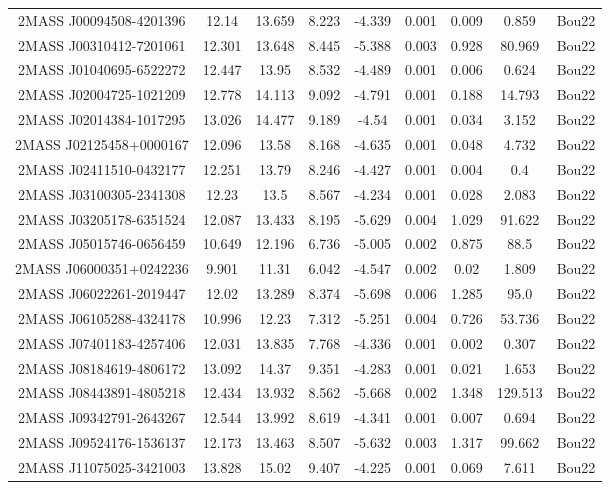 \begin{longtable}{ccccccccc}
  \hline
  \endlastfoot  %
    2MASS J00094508-4201396 & 12.14 & 13.659 & 8.223 & -4.339 & 0.001 & 0.009 & 0.859 & Bou22 \\
    2MASS J00310412-7201061 & 12.301 & 13.648 & 8.445 & -5.388 & 0.003 & 0.928 & 80.969 & Bou22 \\
    2MASS J01040695-6522272 & 12.447 & 13.95 & 8.532 & -4.489 & 0.001 & 0.006 & 0.624 & Bou22 \\
    2MASS J02004725-1021209 & 12.778 & 14.113 & 9.092 & -4.791 & 0.001 & 0.188 & 14.793 & Bou22 \\
    2MASS J02014384-1017295 & 13.026 & 14.477 & 9.189 & -4.54 & 0.001 & 0.034 & 3.152 & Bou22 \\
    2MASS J02125458+0000167 & 12.096 & 13.58 & 8.168 & -4.635 & 0.001 & 0.048 & 4.732 & Bou22 \\
    2MASS J02411510-0432177 & 12.251 & 13.79 & 8.246 & -4.427 & 0.001 & 0.004 & 0.4 & Bou22 \\
    2MASS J03100305-2341308 & 12.23 & 13.5 & 8.567 & -4.234 & 0.001 & 0.028 & 2.083 & Bou22 \\
    2MASS J03205178-6351524 & 12.087 & 13.433 & 8.195 & -5.629 & 0.004 & 1.029 & 91.622 & Bou22 \\
    2MASS J05015746-0656459 & 10.649 & 12.196 & 6.736 & -5.005 & 0.002 & 0.875 & 88.5 & Bou22 \\
    2MASS J06000351+0242236 & 9.901 & 11.31 & 6.042 & -4.547 & 0.002 & 0.02 & 1.809 & Bou22 \\
    2MASS J06022261-2019447 & 12.02 & 13.289 & 8.374 & -5.698 & 0.006 & 1.285 & 95.0 & Bou22 \\
    2MASS J06105288-4324178 & 10.996 & 12.23 & 7.312 & -5.251 & 0.004 & 0.726 & 53.736 & Bou22 \\
    2MASS J07401183-4257406 & 12.031 & 13.835 & 7.768 & -4.336 & 0.001 & 0.002 & 0.307 & Bou22 \\
    2MASS J08184619-4806172 & 13.092 & 14.37 & 9.351 & -4.283 & 0.001 & 0.021 & 1.653 & Bou22 \\
    2MASS J08443891-4805218 & 12.434 & 13.932 & 8.562 & -5.668 & 0.002 & 1.348 & 129.513 & Bou22 \\
    2MASS J09342791-2643267 & 12.544 & 13.992 & 8.619 & -4.341 & 0.001 & 0.007 & 0.694 & Bou22 \\
    2MASS J09524176-1536137 & 12.173 & 13.463 & 8.507 & -5.632 & 0.003 & 1.317 & 99.662 & Bou22 \\
    2MASS J11075025-3421003 & 13.828 & 15.02 & 9.407 & -4.225 & 0.001 & 0.069 & 7.611 & Bou22 \\

\end{longtable}
